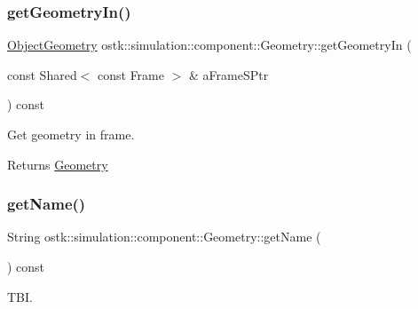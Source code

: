 \subsubsection{\texorpdfstring{get\+Geometry\+In()}{getGeometryIn()}}
{\footnotesize\ttfamily \hyperlink{namespaceostk_1_1simulation_1_1component_a911837ab7e6f8471e9927a74795a0077}{Object\+Geometry} ostk\+::simulation\+::component\+::\+Geometry\+::get\+Geometry\+In (\begin{DoxyParamCaption}\item[{const Shared$<$ const Frame $>$ \&}]{a\+Frame\+S\+Ptr }\end{DoxyParamCaption}) const}



Get geometry in frame. 

\begin{DoxyReturn}{Returns}
\hyperlink{classostk_1_1simulation_1_1component_1_1_geometry}{Geometry} 
\end{DoxyReturn}
\mbox{\label{classostk_1_1simulation_1_1component_1_1_geometry_a2f13ab1988d7d64407f63100fd547fd0}} 
\subsubsection{\texorpdfstring{get\+Name()}{getName()}}
{\footnotesize\ttfamily String ostk\+::simulation\+::component\+::\+Geometry\+::get\+Name (\begin{DoxyParamCaption}{ }\end{DoxyParamCaption}) const}



T\+BI. 

\mbox{\label{classostk_1_1simulation_1_1component_1_1_geometry_a3fe1b4be3ee05faab0ff647697afcd6e}} 
